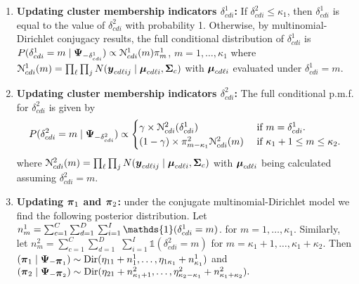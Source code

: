 \begin{enumerate}
\item {\bf Updating cluster membership indicators $\delta^1_{cdi}$: }
  If $\delta^2_{cdi}\leq \kappa_1$, then $\delta^1_{cdi}$ is equal to the value of
  $\delta^2_{cdi}$ with probability 1. Otherwise, by multinomial-Dirichlet
  conjugacy results, the full conditional distribution of
  $\delta^1_{cdi}$ is
  $
  P(\delta^1_{cdi} =m \mid \mbox{\boldmath $\Psi$}_{-\delta^1_{cdi}}) \propto
  {\cal N}^1_{cdi}(m)\pi^1_{m}$, 
  $m=1,\ldots,\kappa_1$ 
where ${\cal N}^1_{cdi}(m)=\prod_{\ell} \prod_j N(\mbox{\boldmath $y$}_{cd\ell ij} \mid
\mbox{\boldmath $\mu$}_{cd\ell i}, \mbox{\boldmath $\Sigma$}_c )$ with $\mbox{\boldmath $\mu$}_{cd\ell i}$ evaluated under
$\delta^1_{cdi}=m$. 
%
\item {\bf Updating cluster membership indicators $\delta^2_{cdi}$: }
The full conditional p.m.f. for $\delta^2_{cdi}$ is given by
\begin{equation*}
P(\delta^2_{cdi} = m \mid \mbox{\boldmath $\Psi$}_{-\delta^2_{cdi}}) \propto
\begin{cases}
  \gamma \times {\cal N}^2_{cdi}(\delta^1_{cdi} )
  & \mbox{ if } m =  \delta^1_{cdi}.\\ 
  (1-\gamma) \times \pi^2_{m-\kappa_1}  {\cal N}^2_{cdi}(m)
  & \mbox{ if } \kappa_1+1\leq m \leq \kappa_2.
\end{cases}
\end{equation*}
where ${\cal N}^2_{cdi}(m)=\prod_{\ell} \prod_j
N(\mbox{\boldmath $y$}_{cd\ell ij} \mid \mbox{\boldmath $\mu$}_{cd\ell i}, \mbox{\boldmath $\Sigma$}_c )$ with $\mbox{\boldmath $\mu$}_{cd\ell
i}$ being calculated assuming $\delta^2_{cdi}=m$. 
%
\item {\bf Updating $\mbox{\boldmath $\pi$}_{1}$ and $\mbox{\boldmath $\pi$}_2$: }
under the conjugate multinomial-Dirichlet model we
find the following posterior distribution.
Let 
$n^1_m = \sum^C_{c=1} \sum^D_{d=1} \\ \sum^I_{i=1}
\mathds{1}(\delta^1_{cdi}=m)$. 
for $m=1, \ldots, \kappa_1$.
Similarly, let 
$n^2_m = \sum^C_{c=1} \sum^D_{d=1}$ $\sum^I_{i=1} \mathds{1}(\delta^2_{cdi}=m)$ for 
$m=\kappa_1+1,\ldots,\kappa_1+\kappa_2$.
Then $
  (\mbox{\boldmath $\pi$}_1 \mid \mbox{\boldmath $\Psi$}_{-\mbox{\boldmath $\pi$}_1}) \sim \mbox{Dir}(\eta_{11}     +n^1_1,\ldots,
                               \eta_{1\kappa_1}+n^1_{\kappa_1})
$
and
$
(\mbox{\boldmath $\pi$}_2 \mid \mbox{\boldmath $\Psi$}_{-\mbox{\boldmath $\pi$}_2}) \sim \mbox{Dir}(\eta_{21}+n^2_{\kappa_1+1}, \ldots, 
                     \eta^2_{\kappa_2-\kappa_1} +n^2_{\kappa_1+\kappa_2}). 
$


\end{enumerate}
